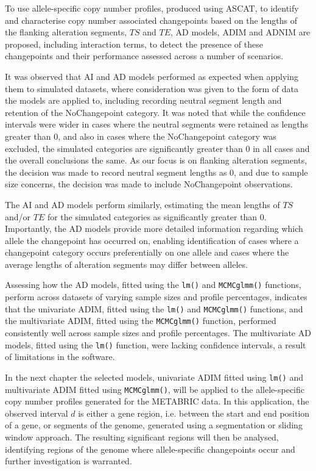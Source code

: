 To use allele-specific copy number profiles, produced using ASCAT, to identify and characterise copy number associated changepoints based on the lengths of the flanking alteration segments, $TS$ and $TE$, AD models, ADIM and ADNIM are proposed, including interaction terms, to detect the presence of these changepoints and their performance assessed across a number of scenarios. 

It was observed that AI and AD models performed as expected when applying them to simulated datasets, where consideration was given to the form of data the models are applied to, including recording neutral segment length and retention of the NoChangepoint category. It was noted that while the confidence intervals were wider in cases where the neutral segments were retained as lengths greater than 0, and also in cases where the NoChangepoint category was excluded, the simulated categories are significantly greater than 0 in all cases and the overall conclusions the same. As our focus is on flanking alteration segments, the decision was made to record neutral segment lengths as 0, and due to sample size concerns, the decision was made to include NoChangepoint observations.

The AI and AD models perform similarly, estimating the mean lengths of $TS$ and/or $TE$ for the simulated categories as significantly greater than 0. Importantly, the AD models provide more detailed information regarding which allele the changepoint has occurred on, enabling identification of cases where a changepoint category occurs preferentially on one allele and cases where the average lengths of alteration segments may differ between alleles. 

Assessing how the AD models, fitted using the \texttt{lm()} and \texttt{MCMCglmm()} functions, perform across datasets of varying sample sizes and profile percentages, indicates that the univariate ADIM, fitted using the \texttt{lm()} and \texttt{MCMCglmm()} functions, and the multivariate ADIM, fitted using the \texttt{MCMCglmm()} function, performed consistently well across sample sizes and profile percentages. The multivariate AD models, fitted using the \texttt{lm()} function, were lacking confidence intervals, a result of limitations in the software.

In the next chapter the selected models, univariate ADIM fitted using \texttt{lm()} and multivariate ADIM fitted using \texttt{MCMCglmm()}, will be applied to the allele-specific copy number profiles generated for the METABRIC data. In this application, the observed interval $d$ is either a gene region, i.e. between the start and end position of a gene, or segments of the genome, generated using a segmentation or sliding window approach. The resulting significant regions will then be analysed, identifying regions of the genome where allele-specific changepoints occur and further investigation is warranted. 